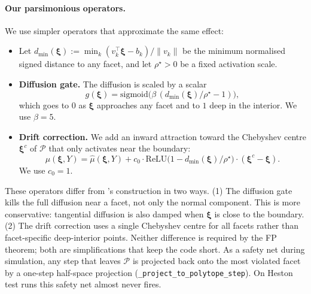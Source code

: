 \documentclass[11pt]{article}
\newcommand{\xib}{\boldsymbol{\xi}}
\newcommand{\1}{\mathbf{1}}
\begin{document}
\paragraph{Our parsimonious operators.}
We use simpler operators that approximate the same effect:
\begin{itemize}
\item Let $d_{\min}(\xib) := \min_k (v_k^\top \xib - b_k)/\|v_k\|$ be the minimum normalised signed distance to any facet, and let $\rho^\star > 0$ be a fixed activation scale.
\item \textbf{Diffusion gate.} The diffusion is scaled by a scalar
\begin{equation}
g(\xib) = \mathrm{sigmoid}\bigl(\beta\, (d_{\min}(\xib)/\rho^\star - 1)\bigr),
\label{eq:gate}
\end{equation}
which goes to $0$ as $\xib$ approaches any facet and to $1$ deep in the interior. We use $\beta = 5$.
\item \textbf{Drift correction.} We add an inward attraction toward the Chebyshev centre $\xib^c$ of $\mathcal P$ that only activates near the boundary:
\begin{equation}
\mu(\xib, Y) = \hat\mu(\xib, Y) + c_0 \cdot \mathrm{ReLU}\bigl(1 - d_{\min}(\xib)/\rho^\star\bigr) \cdot (\xib^c - \xib).
\label{eq:drift-pull}
\end{equation}
We use $c_0 = 1$.
\end{itemize}

These operators differ from \citet{cohen2021}'s construction in two ways. (1) The diffusion gate kills the full diffusion near a facet, not only the normal component. This is more conservative: tangential diffusion is also damped when $\xib$ is close to the boundary. (2) The drift correction uses a single Chebyshev centre for all facets rather than facet-specific deep-interior points. Neither difference is required by the FP theorem; both are simplifications that keep the code short. As a safety net during simulation, any step that leaves $\mathcal P$ is projected back onto the most violated facet by a one-step half-space projection (\texttt{\_project\_to\_polytope\_step}). On Heston test runs this safety net almost never fires.
\end{document}
